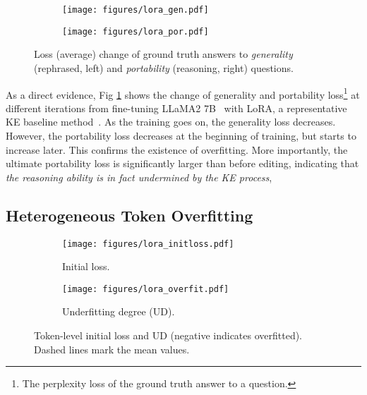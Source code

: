 \begin{figure}[htb!]
\captionsetup[subfigure]{font=footnotesize,labelformat=parens,labelfont=footnotesize}
\def\subfigwidth{0.4\linewidth}
\centering
\begin{subfigure}[t]{\subfigwidth}
    \texttt{[image: figures/lora\_gen.pdf]}
\end{subfigure}%
\begin{subfigure}[t]{\subfigwidth}
    \texttt{[image: figures/lora\_por.pdf]}
\end{subfigure}%

\caption{
Loss (average) change of ground truth answers to \textit{generality} (rephrased, left)
and \textit{portability} (reasoning, right) questions. 
}
\label{fig:overfit}
\vspace{-0.2cm}
\end{figure}

As a direct evidence, Fig \ref{fig:overfit} shows the change of generality and portability loss\footnote{The perplexity loss of the ground truth answer to a question.} at different iterations from fine-tuning LLaMA2 7B~\citep{touvron2023llama} with LoRA, a representative KE baseline method~\citep{zhang2024comprehensive}. 
As the training goes on, the generality loss decreases. However, the portability loss decreases at the beginning of training, but starts to increase later.
This confirms the existence of overfitting.
More importantly, 
the ultimate portability loss is significantly larger than before editing, indicating that 
\textit{the reasoning ability is in fact undermined by the KE process}, 


\subsection{Heterogeneous Token Overfitting}



\begin{figure}[htb!]
\captionsetup[subfigure]{font=footnotesize,labelformat=parens,labelfont=footnotesize}
\def\subfigwidth{0.4\linewidth}
\centering
\begin{subfigure}[t]{\subfigwidth}
    \texttt{[image: figures/lora\_initloss.pdf]}
    \caption{Initial loss.}
    \label{fig:init-loss}
\end{subfigure}%
\begin{subfigure}[t]{\subfigwidth}
    \texttt{[image: figures/lora\_overfit.pdf]}
    \caption{Underfitting degree (UD).}
    \label{fig:hto}
\end{subfigure}%

\caption{
Token-level initial loss and UD (negative indicates overfitted).
Dashed lines mark the mean values.
}
\vspace{-0.2cm}
\end{figure}


